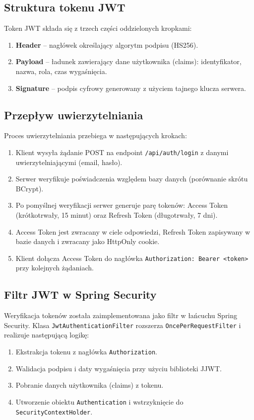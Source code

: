 ﻿\documentclass[a4paper,twoside,11pt]{mwrep}
\theoremstyle{plain} \newtheorem{thm}{Twierdzenie}
\theoremstyle{plain} \newtheorem{lem}{Lemat}
\theoremstyle{definition} \newtheorem{defn}{Definicja}
\theoremstyle{remark} \newtheorem*{rem}{Wniosek}
\begin{document}
\subsection{Struktura tokenu JWT}

Token JWT składa się z trzech części oddzielonych kropkami:
\begin{enumerate}
    \item \textbf{Header} -- nagłówek określający algorytm podpisu (HS256).
    \item \textbf{Payload} -- ładunek zawierający dane użytkownika (claims): identyfikator, nazwa, rola, czas wygaśnięcia.
    \item \textbf{Signature} -- podpis cyfrowy generowany z użyciem tajnego klucza serwera.
\end{enumerate}

\subsection{Przepływ uwierzytelniania}

Proces uwierzytelniania przebiega w następujących krokach:
\begin{enumerate}
    \item Klient wysyła żądanie POST na endpoint \texttt{/api/auth/login} z danymi uwierzytelniającymi (email, hasło).
    \item Serwer weryfikuje poświadczenia względem bazy danych (porównanie skrótu BCrypt).
    \item Po pomyślnej weryfikacji serwer generuje parę tokenów: Access Token (krótkotrwały, 15 minut) oraz Refresh Token (długotrwały, 7 dni).
    \item Access Token jest zwracany w ciele odpowiedzi, Refresh Token zapisywany w bazie danych i zwracany jako HttpOnly cookie.
    \item Klient dołącza Access Token do nagłówka \texttt{Authorization: Bearer <token>} przy kolejnych żądaniach.
\end{enumerate}

\subsection{Filtr JWT w Spring Security}

Weryfikacja tokenów została zaimplementowana jako filtr w łańcuchu Spring Security. Klasa \texttt{JwtAuthenticationFilter} rozszerza \texttt{OncePerRequestFilter} i realizuje następującą logikę:

\begin{enumerate}
    \item Ekstrakcja tokenu z nagłówka \texttt{Authorization}.
    \item Walidacja podpisu i daty wygaśnięcia przy użyciu biblioteki JJWT.
    \item Pobranie danych użytkownika (claims) z tokenu.
    \item Utworzenie obiektu \texttt{Authentication} i wstrzyknięcie do \texttt{SecurityContextHolder}.
\end{enumerate}
\end{document}
